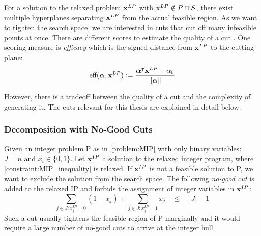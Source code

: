 For a solution to the relaxed problem $\bold x^{LP}$ with $\bold x^{LP} \notin P \cap S$, there exist multiple hyperplanes separating $\bold x^{LP}$ from the actual feasible region. %
As we want to tighten the search space, we are interested in cuts that cut off many infeasible points at once. There are different scores to estimate the quality of a cut \cite{turner_adaptive_2023}
. One scoring measure is \textit{efficacy} which is the signed distance from $\bold x^{LP}$ to the cutting plane:
\begin{equation}
    \text{eff}(\boldsymbol \alpha, \bold x^{LP}) := \frac{\boldsymbol \alpha^\intercal \bold x^{LP} - \alpha_0}{\lVert \boldsymbol \alpha \rVert}
\end{equation}

However, there is a tradeoff between the quality of a cut and the complexity of generating it.
The cuts relevant for this thesis are explained in detail below. 


\subsubsection{Decomposition with No-Good Cuts}
Given an integer problem P as in \cref{problem:MIP} with only binary variables: $J=n$ and $x_i \in \{0,1\}$. Let $\bold x^{IP}$ a solution to the relaxed integer program,  where \cref{constraint:MIP_inequality} is relaxed. 
If $\bold x^{IP}$ is not a feasible solution to P, we want to exclude the solution from the search space. The following \textit{no-good cut} is added to the relaxed IP and forbids the assignment of integer variables in $\bold x^{IP}$:
\begin{equation*}
    \sum_{j \in J: x_j^{IP}=0} (1 - x_{j}) + \sum_{j \in J: x_j^{IP}=1} x_j \quad \leq \quad |J| -1
\end{equation*}
Such a cut usually tightens the feasible region of P marginally and it would require a large number of no-good cuts to arrive at the integer hull.

